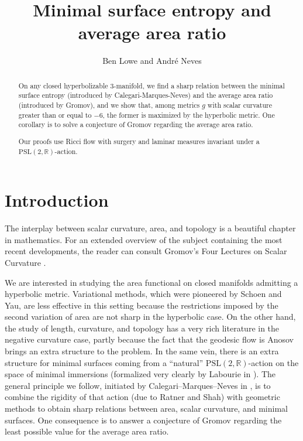 \documentclass[11pt]{amsart}
\title{Minimal surface entropy and average area ratio}
\author{Ben Lowe and Andr\'e Neves}
\def\R{\mathbb R}
\theoremstyle{remark}
\theoremstyle{definition}
\begin{document}
	
	
	\begin{abstract}
		On any closed hyperbolizable $3$-manifold, we find a sharp relation  between the minimal surface entropy (introduced by Calegari-Marques-Neves) and the average area ratio  (introduced by Gromov), and we show that, among metrics $g$ with  scalar curvature  greater than or equal to $-6$, the former is maximized by the hyperbolic metric. One corollary is to solve a conjecture of Gromov regarding the average area ratio.%
		
		{Our proofs} use Ricci flow with surgery and laminar measures invariant under a $\text {PSL}(2,\R)$-action.
	\end{abstract}
	
	\maketitle 
	\section{Introduction}
	
	The interplay between scalar curvature, area, and topology is a beautiful chapter in mathematics.  For an extended overview of the subject containing the most recent developments, the reader can consult  Gromov's Four Lectures on Scalar Curvature  \cite{gromov4}. 
	
	We are interested in studying the area functional on closed  manifolds admitting a hyperbolic metric. Variational methods, which were pioneered by Schoen and Yau, are less effective in this setting  because  the restrictions imposed by the second variation of area are not sharp in the hyperbolic case. On the other hand, the study of length, curvature, and topology has a very rich literature in the negative curvature case, partly because the fact that the geodesic flow is Anosov brings an extra structure to the problem. In the same vein, there is an extra structure for minimal surfaces coming from a ``natural'' $\text {PSL}(2,\R)$-action on the space of minimal  immersions {(formalized very clearly by Labourie in \cite{Labourie}}). The general principle we follow, initiated by Calegari--Marques--Neves in \cite{cal-marques-neves}, is to combine the rigidity of that action (due to Ratner and Shah) with  geometric methods to obtain sharp relations between area, scalar curvature, and minimal surfaces.  One consequence is to answer a  conjecture of Gromov regarding the least possible value for the average area ratio.
	
\end{document}
